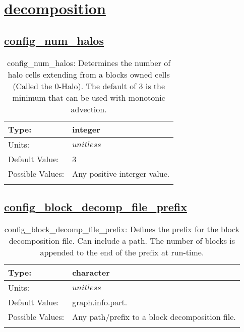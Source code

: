 \section[decomposition]{\hyperref[sec:nm_tab_decomposition]{decomposition}}
\label{sec:nm_sec_decomposition}
\subsection[config\_num\_halos]{\hyperref[sec:nm_tab_decomposition]{config\_num\_halos}}
\label{subsec:nm_sec_config_num_halos}
\begin{center}
\begin{longtable}{| p{2.0in} | p{4.0in} |}
    \hline
    Type: & integer \\
    \hline
    Units: & $unitless$ \\
    \hline
    Default Value: & 3 \\
    \hline
    Possible Values: & Any positive interger value. \\
    \hline
    \caption{config\_num\_halos: Determines the number of halo cells extending from a blocks owned cells (Called the 0-Halo). The default of 3 is the minimum that can be used with monotonic advection.}
\end{longtable}
\end{center}
\subsection[config\_block\_decomp\_file\_prefix]{\hyperref[sec:nm_tab_decomposition]{config\_block\_decomp\_file\_prefix}}
\label{subsec:nm_sec_config_block_decomp_file_prefix}
\begin{center}
\begin{longtable}{| p{2.0in} | p{4.0in} |}
    \hline
    Type: & character \\
    \hline
    Units: & $unitless$ \\
    \hline
    Default Value: & graph.info.part. \\
    \hline
    Possible Values: & Any path/prefix to a block decomposition file. \\
    \hline
    \caption{config\_block\_decomp\_file\_prefix: Defines the prefix for the block decomposition file. Can include a path. The number of blocks is appended to the end of the prefix at run-time.}
\end{longtable}
\end{center}

